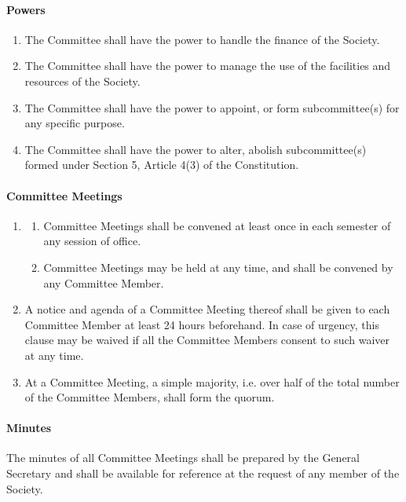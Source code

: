 \documentclass[11pt,a4paper,notitlepage]{article}
\begin{document}
	
	
	\paragraph{Powers} 
		\begin{enumerate}
			\item The Committee shall have the power to handle the finance of the Society. 
			\item The Committee shall have the power to manage the use of the facilities and resources of the Society. 
			\item The Committee shall have the power to appoint, or form subcommittee(s) for any specific purpose. 
			\item The Committee shall have the power to alter, abolish subcommittee(s) formed under Section 5, Article 4(3) of the Constitution. 
		\end{enumerate}
	
	\paragraph{Committee Meetings} 
		\begin{enumerate}
			\item
			\begin{enumerate}[label=\Alph*.]
				\item Committee Meetings shall be convened at least once in each semester of any session of office. 
				\item Committee Meetings may be held at any time, and shall be convened by any Committee Member.
			\end{enumerate} 
		\item A notice and agenda of a Committee Meeting thereof shall be given to each Committee Member at least 24 hours beforehand. In case of urgency, this clause may be waived if all the Committee Members consent to such waiver at any time. 
		\item At a Committee Meeting, a simple majority, i.e. over half of the total number of the Committee Members, shall form the quorum. 
		\end{enumerate}
	
	
	\paragraph{Minutes} 
	The minutes of all Committee Meetings shall be prepared by the General Secretary and shall be available for reference at the request of any member of the Society. 
	
\end{document}
